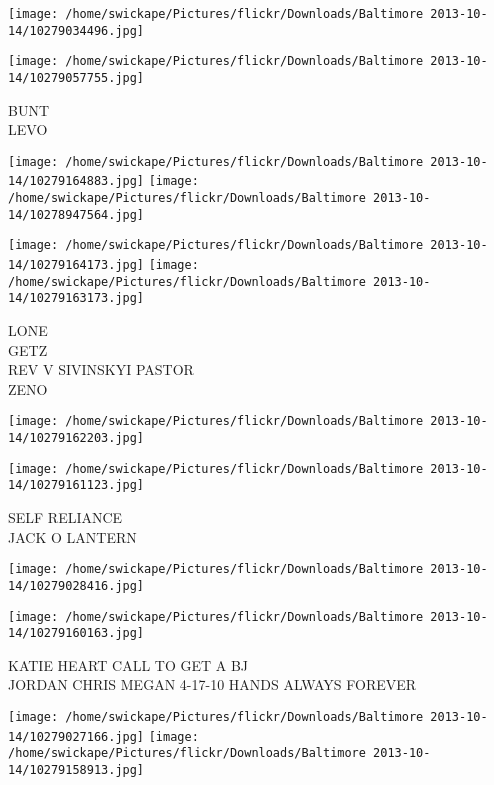 \documentclass[10pt,letterpaper]{article}
\begin{document}
\texttt{[image: /home/swickape/Pictures/flickr/Downloads/Baltimore 2013-10-14/10279034496.jpg]}

\vspace{0.25in}
\texttt{[image: /home/swickape/Pictures/flickr/Downloads/Baltimore 2013-10-14/10279057755.jpg]}

BUNT\\
LEVO\\
\pagebreak

\texttt{[image: /home/swickape/Pictures/flickr/Downloads/Baltimore 2013-10-14/10279164883.jpg]}
\texttt{[image: /home/swickape/Pictures/flickr/Downloads/Baltimore 2013-10-14/10278947564.jpg]}

\texttt{[image: /home/swickape/Pictures/flickr/Downloads/Baltimore 2013-10-14/10279164173.jpg]}
\texttt{[image: /home/swickape/Pictures/flickr/Downloads/Baltimore 2013-10-14/10279163173.jpg]}

LONE\\
GETZ\\
REV V SIVINSKYI PASTOR\\
ZENO\\
\pagebreak

\texttt{[image: /home/swickape/Pictures/flickr/Downloads/Baltimore 2013-10-14/10279162203.jpg]}

\vspace{0.25in}
\texttt{[image: /home/swickape/Pictures/flickr/Downloads/Baltimore 2013-10-14/10279161123.jpg]}

SELF RELIANCE\\
JACK O LANTERN\\
\pagebreak

\texttt{[image: /home/swickape/Pictures/flickr/Downloads/Baltimore 2013-10-14/10279028416.jpg]}

\vspace{0.25in}
\texttt{[image: /home/swickape/Pictures/flickr/Downloads/Baltimore 2013-10-14/10279160163.jpg]}

KATIE HEART CALL TO GET A BJ\\
JORDAN CHRIS MEGAN 4{-}17{-}10 HANDS ALWAYS FOREVER\\
\pagebreak

\texttt{[image: /home/swickape/Pictures/flickr/Downloads/Baltimore 2013-10-14/10279027166.jpg]}
\texttt{[image: /home/swickape/Pictures/flickr/Downloads/Baltimore 2013-10-14/10279158913.jpg]}
\end{document}
